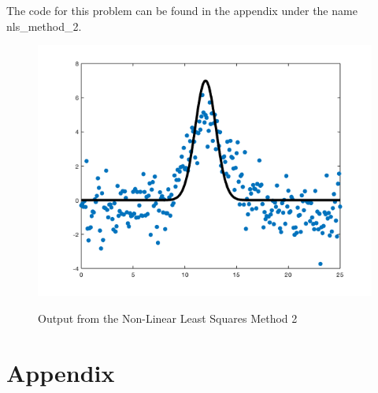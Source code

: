 \documentclass[12pt]{article}
\begin{document}
The code for this problem can be found in the appendix under the name nls\_method\_2. 

\begin{figure}[h!]
    \centering
    {{\includegraphics[width=15cm]{nls_method_2.png}}}%
    \qquad
    \caption{Output from the Non-Linear Least Squares Method 2}%
    \label{fig:example}%
\end{figure}

\newpage

\section*{Appendix}
\end{document}
